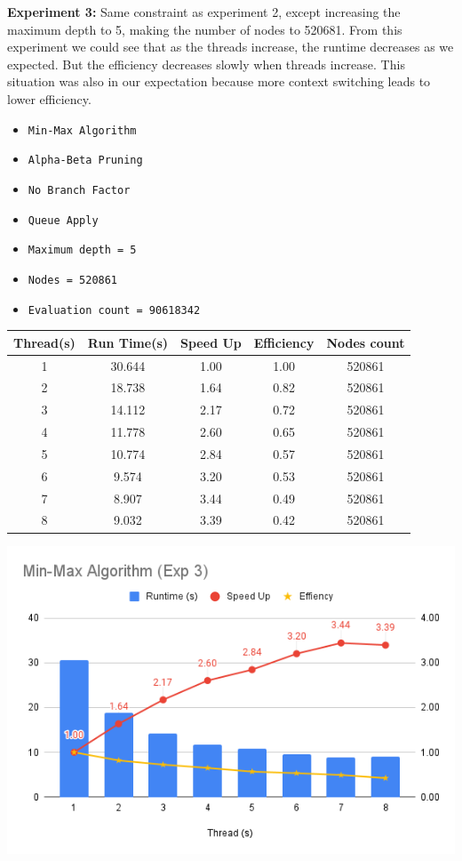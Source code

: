 \documentclass[sigconf]{acmart}
\begin{document}
{\bfseries Experiment 3:}
Same constraint as experiment 2, except increasing the maximum depth to 5, making the number of nodes to 520681. From this experiment we could see that as the threads increase, the runtime decreases as we expected.  But the efficiency decreases slowly when threads increase. This situation was also in our expectation because more context switching leads to lower efficiency.

\begin{itemize}
\item {\verb|Min-Max Algorithm|}
\item {\verb|Alpha-Beta Pruning|}
\item {\verb|No Branch Factor|}
\item {\verb|Queue Apply|}
\item {\verb|Maximum depth = 5|}
\item {\verb|Nodes = 520861|}
\item {\verb|Evaluation count = 90618342|}
\end{itemize}
\begin{center}
  \label{tab:commands}
  \begin{tabular}{c c c c c}
    \toprule
    Thread(s)& Run Time(s) & Speed Up & Efficiency & Nodes count\\
    \midrule
    1 & 30.644 & 1.00 & 1.00 & 520861\\
    2 & 18.738 & 1.64 & 0.82 & 520861\\
    3 & 14.112 & 2.17 & 0.72 & 520861\\
    4 & 11.778 & 2.60 & 0.65 & 520861\\
    5 & 10.774 & 2.84 & 0.57 & 520861\\
    6 & 9.574  & 3.20 & 0.53 & 520861\\
    7 & 8.907  & 3.44 & 0.49 & 520861\\
    8 & 9.032  & 3.39 & 0.42 & 520861\\
    \bottomrule
  \end{tabular}
\end{center}
\includegraphics[scale=0.40]{images/exp3.png}
\end{document}
